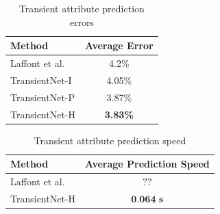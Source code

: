 \documentclass[10pt,twocolumn,letterpaper]{article}
\begin{document}
\begin{table}[t]
	\centering
	\begin{tabular}{ | l | c | }
		\hline
			Method & Average Error \\ \hline \hline
			Laffont et al.~\cite{Laffont14}& 4.2\% \\ \hline
			TransientNet-I & 4.05\% \\ \hline
			TransientNet-P & 3.87\% \\ \hline
			TransientNet-H & \textbf{3.83\%} \\ 
		\hline
	\end{tabular}
	\caption{Transient attribute prediction errors}
	\label{tbl:transient}
\end{table}

\begin{table}[t]
	\centering
	\begin{tabular}{ | l | c | }
		\hline
			Method & Average Prediction Speed \\ \hline \hline
			Laffont et al.~\cite{lutwoclass}& $ ?? $ \\ \hline
			TransientNet-H & $ \textbf{0.064 s} $ \\ 
		\hline
	\end{tabular}
	\caption{Transient attribute prediction speed}
	\label{tbl:timing}
\end{table}


\end{document}
